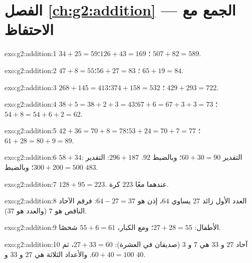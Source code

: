 \section*{الفصل \ref{ch:g2:addition} --- الجمع مع الاحتفاظ}

\begin{solution}{exo:g2:addition:1}
$34 + 25 = 59$؛ \quad $126 + 43 = 169$؛ \quad $507 + 82 = 589$.
\end{solution}

\begin{solution}{exo:g2:addition:2}
$47 + 8 = 55$؛ \quad $56 + 27 = 83$؛ \quad $65 + 19 = 84$.
\end{solution}

\begin{solution}{exo:g2:addition:3}
$268 + 145 = 413$؛ \quad $374 + 158 = 532$؛ \quad
$429 + 293 = 722$.
\end{solution}

\begin{solution}{exo:g2:addition:4}
$38 + 5 = 38 + 2 + 3 = 43$؛ \quad $67 + 6 = 67 + 3 + 3 = 73$؛ \quad
$54 + 8 = 54 + 6 + 2 = 62$.
\end{solution}

\begin{solution}{exo:g2:addition:5}
$42 + 36 = 70 + 8 = 78$؛ \quad $53 + 24 = 70 + 7 = 77$؛ \quad
$61 + 28 = 80 + 9 = 89$.
\end{solution}

\begin{solution}{exo:g2:addition:6}
$58 + 34$: التقدير $60 + 30 = 90$؛ وبالضبط $92$.
$296 + 187$: التقدير $300 + 200 = 500$؛ وبالضبط $483$.
\end{solution}

\begin{solution}{exo:g2:addition:7}
$128 + 95 = 223$. عندهما معًا $223$ كرة.
\end{solution}

\begin{solution}{exo:g2:addition:8}
العدد الأول زائد $27$ يساوي $64$، إذن هو $64 - 27 = 37$: فرقم
الآحاد الناقص هو $7$ (والعدد هو $37$).
\end{solution}

\begin{solution}{exo:g2:addition:9}
الأطفال: $27 + 28 = 55$؛ ومع الكبار، $55 + 6 = 61$
شخصًا.
\end{solution}

\begin{solution}{exo:g2:addition:10}
آحاد $27$ و $33$ هي $7$ و $3$ (صديقان في العشرة):
$27 + 33 = 60$، ثم $60 + 40 = 100$. والأعداد الثلاثة هي
$27$ و $33$ و $40$.
\end{solution}
